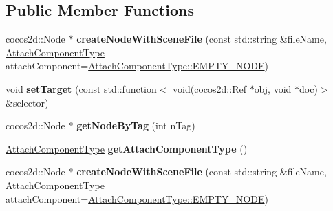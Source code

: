 \subsection*{Public Member Functions}
\begin{DoxyCompactItemize}
\item 
\mbox{\label{classcocostudio_1_1SceneReader_a87ee6ca95ad6850d835d8270d753cffc}} 
cocos2d\+::\+Node $\ast$ {\bfseries create\+Node\+With\+Scene\+File} (const std\+::string \&file\+Name, \hyperlink{classcocostudio_1_1SceneReader_ae79446a46e4d2fecfe754382fc2ec24a}{Attach\+Component\+Type} attach\+Component=\hyperlink{classcocostudio_1_1SceneReader_ae79446a46e4d2fecfe754382fc2ec24aa78b78d6b8a3e32acb73e0fdb30a7ffef}{Attach\+Component\+Type\+::\+E\+M\+P\+T\+Y\+\_\+\+N\+O\+DE})
\item 
\mbox{\label{classcocostudio_1_1SceneReader_a7fe085b410a04f462a2769daf13f34c6}} 
void {\bfseries set\+Target} (const std\+::function$<$ void(cocos2d\+::\+Ref $\ast$obj, void $\ast$doc)$>$ \&selector)
\item 
\mbox{\label{classcocostudio_1_1SceneReader_aaf8b71bf0af6fa67ee4d7c7424fe6b65}} 
cocos2d\+::\+Node $\ast$ {\bfseries get\+Node\+By\+Tag} (int n\+Tag)
\item 
\mbox{\label{classcocostudio_1_1SceneReader_a6f19ab8407b0d3b3edbd57c30600f93d}} 
\hyperlink{classcocostudio_1_1SceneReader_ae79446a46e4d2fecfe754382fc2ec24a}{Attach\+Component\+Type} {\bfseries get\+Attach\+Component\+Type} ()
\item 
\mbox{\label{classcocostudio_1_1SceneReader_a0db0030abece29ef017a1ab61f339488}} 
cocos2d\+::\+Node $\ast$ {\bfseries create\+Node\+With\+Scene\+File} (const std\+::string \&file\+Name, \hyperlink{classcocostudio_1_1SceneReader_ae79446a46e4d2fecfe754382fc2ec24a}{Attach\+Component\+Type} attach\+Component=\hyperlink{classcocostudio_1_1SceneReader_ae79446a46e4d2fecfe754382fc2ec24aa78b78d6b8a3e32acb73e0fdb30a7ffef}{Attach\+Component\+Type\+::\+E\+M\+P\+T\+Y\+\_\+\+N\+O\+DE})
\item 
\mbox{\label{classcocostudio_1_1SceneReader_a7fe085b410a04f462a2769daf13f34c6}} 

\end{DoxyCompactItemize}
